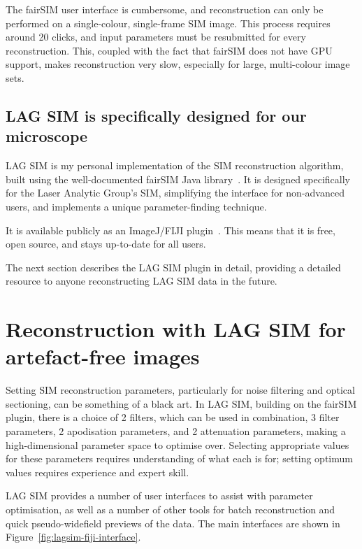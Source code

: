 The fairSIM user interface is cumbersome, and reconstruction can only be performed on a single-colour, single-frame SIM image. 
This process requires around 20 clicks, and input parameters must be resubmitted for every reconstruction. 
This, coupled with the fact that fairSIM does not have GPU support, makes reconstruction very slow, especially for large, multi-colour image sets. 


\subsection{LAG SIM is specifically designed for our microscope}
LAG SIM is my personal implementation of the SIM reconstruction algorithm, built using the well-documented fairSIM Java library~\cite{fairsimGithub}. 
It is designed specifically for the Laser Analytic Group's SIM, simplifying the interface for non-advanced users, and implements a unique parameter-finding technique.

It is available publicly as an ImageJ/FIJI plugin~\cite{lagsim}.
This means that it is free, open source, and stays up-to-date for all users. 

The next section describes the LAG SIM plugin in detail, providing a detailed resource to anyone reconstructing LAG SIM data in the future.

\section{Reconstruction with LAG SIM for artefact-free images} \label{sec:lagsimFiji}
Setting SIM reconstruction parameters, particularly for noise filtering and optical sectioning, can be something of a black art.
In LAG SIM, building on the fairSIM plugin, there is a choice of 2 filters, which can be used in combination, 3 filter parameters, 2 apodisation parameters, and 2 attenuation parameters, making a high-dimensional parameter space to optimise over. 
Selecting appropriate values for these parameters requires understanding of what each is for; setting optimum values requires experience and expert skill.

LAG SIM provides a number of user interfaces to assist with parameter optimisation, as well as a number of other tools for batch reconstruction and quick pseudo-widefield previews of the data. 
The main interfaces are shown in Figure~\ref{fig:lagsim-fiji-interface}. 


